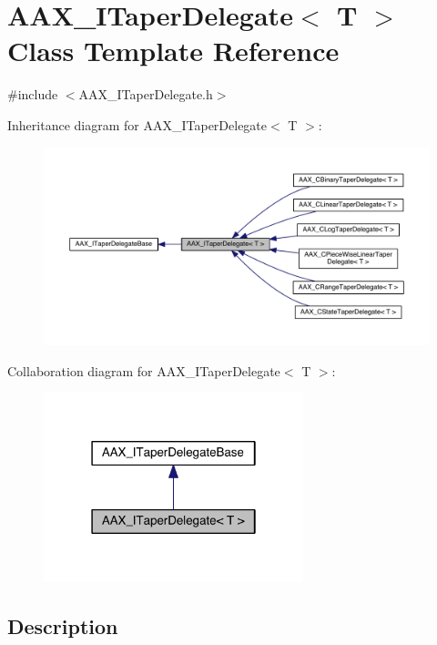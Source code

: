 \hypertarget{a00114}{}\section{A\+A\+X\+\_\+\+I\+Taper\+Delegate$<$ T $>$ Class Template Reference}
\label{a00114}


{\ttfamily \#include $<$A\+A\+X\+\_\+\+I\+Taper\+Delegate.\+h$>$}



Inheritance diagram for A\+A\+X\+\_\+\+I\+Taper\+Delegate$<$ T $>$\+:
\nopagebreak
\begin{figure}[H]
\begin{center}
\leavevmode
\includegraphics[width=350pt]{a00661}
\end{center}
\end{figure}


Collaboration diagram for A\+A\+X\+\_\+\+I\+Taper\+Delegate$<$ T $>$\+:
\nopagebreak
\begin{figure}[H]
\begin{center}
\leavevmode
\includegraphics[width=214pt]{a00662}
\end{center}
\end{figure}


\subsection{Description}

